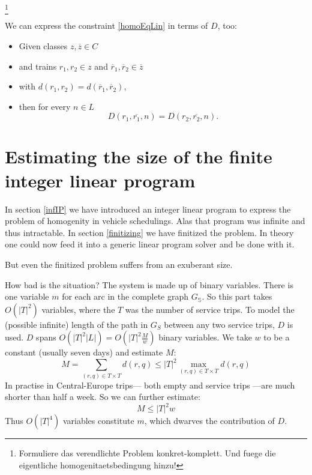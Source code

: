 \documentclass[a4paper]{amsart} %
\newcommand{\ol}[1]{\overline{#1}}
\newcommand{\todo}[1]{\footnote{#1}}
\newcommand{\abs}[1]{\ensuremath{\left|#1\right|}}
\newcommand{\lr}[1]{\ensuremath{\left( #1 \right)}}
\begin{document}
\todo{Formuliere das verendlichte Problem konkret-komplett.  Und fuege die eigentliche homogenitaetsbedingung hinzu!}

We can express the constraint \ref{homoEqLin} in terms of \(D\), too:
\begin{itemize}
\item Given classes \(z, \ol{z} \in C\)
\item and trains \(r_1, r_2 \in z\) and \(\ol{r}_1,\ol{r}_2 \in \ol{z}\)
\item with \( d (r_1, r_2) = d(\ol{r}_1, \ol{r}_2) \),
\item then for every \(n \in L\)
\begin{equation}
\label{homoEqFin}
  D    (r_1, \ol{r_1}, n) = D (r_2, \ol{r_2}, n)\textrm{.}
\end{equation}
\end{itemize}

\section{Estimating the size of the finite integer linear program}
In section \ref{infIP} we have introduced an integer linear program to
express the problem of homogenity in vehicle schedulings.  Alas that
program was infinite and thus intractable.  In section
\ref{finitizing} we have finitized the problem.  In theory one could
now feed it into a generic linear program solver and be done with it.

But even the finitized problem suffers from an exuberant size.

How bad is the situation?  The system is made up of binary variables.
There is one variable \(m\) for each arc in the complete graph
\(G_\mathbb{S}\).  So this part takes \(O\left(\left|
    T\right|^2\right)\) variables, where the \(T\) was the number of
service trips.  To model the (possible infinite) length of the path in
\(G_S\) between any two service trips, \(D\) is used.  \(D\) spans
\(O\lr{\abs{T}^2 \abs{L}} =
O\lr{\abs{T}^2 \frac{M}{w}} \) binary variables.  We
take \(w\) to be a constant (usually seven days) and estimate \(M\):
\begin{equation}
M = \sum_{(r,q) \in T \times T} d (r,q) \leq \left|T\right|^2 \max_{(r,q) \in T \times T} d(r,q)
\end{equation}
In practise in Central-Europe trips--- both empty and service trips
---are much shorter than half a week.  So we can further estimate:
\begin{equation}
M \leq \left|T\right|^2 w
\end{equation}
Thus \(O\lr{\abs{T}^4}\) variables constitute \(m\), which
dwarves the contribution of \(D\).
\end{document}
